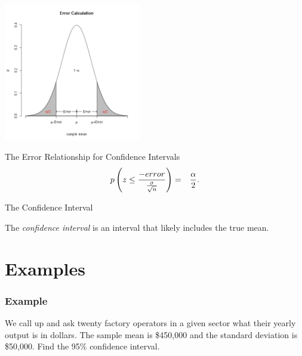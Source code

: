 \begin{frame}

  \centerline{\includegraphics[width=6cm]{img/confidenceInterval}}

  \begin{block}{The Error Relationship for Confidence Intervals}
    \begin{eqnarray*}
      p\left( z \leq \frac{-error}{\frac{\sigma}{\sqrt{n}}}\right) & = & \frac{\alpha}{2}.
    \end{eqnarray*}
  \end{block}

\end{frame}


\begin{frame}{The Confidence Interval}
  \begin{definition}
    The \textit{confidence interval} is an interval that likely
    includes the true mean.
  \end{definition}
\end{frame}

\section{Examples}


\begin{frame}
  \frametitle{Example}

  We call up and ask twenty factory operators in a given sector what
  their yearly output is in dollars. The sample mean is \$450,000 and
  the standard deviation is \$50,000. Find the 95\% confidence
  interval.

  \vfill


  \vfill

\end{frame}



